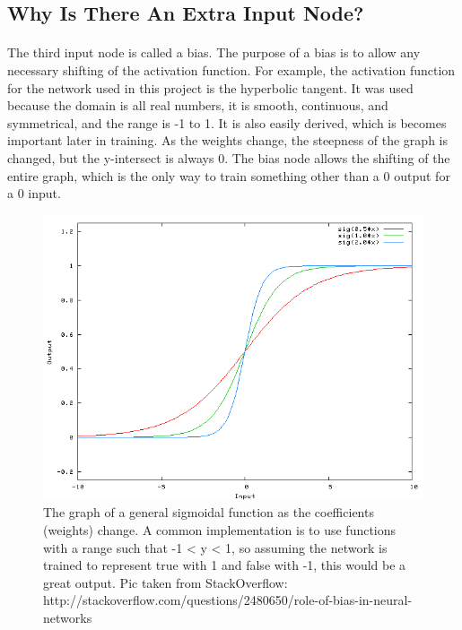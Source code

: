 \documentclass{article}
\begin{document}
\subsection{Why Is There An Extra Input Node?}
    \paragraph{}The third input node is called a bias. The purpose of a bias is to allow
    any necessary shifting of the activation function. For example, the activation function
    for the network used in this project is the hyperbolic tangent. It was used because the
    domain is all real numbers, it is smooth, continuous, and symmetrical, and the range
    is -1 to 1. It is also easily derived, which is becomes important later in training. As
    the weights change, the steepness of the graph is changed, but the y-intersect is always
    0. The bias node allows the shifting of the entire graph, which is the only way to train
    something other than a 0 output for a 0 input.
    \begin{figure}
        \centering
        \includegraphics[scale=0.4]{images/bias.png}
        \caption{The graph of a general sigmoidal function as the coefficients (weights)
            change. A common implementation is to use functions with a range such 
            that -1 < y < 1, so assuming the network is trained to represent true with 1 
            and false with -1, this would be a great output. Pic taken from StackOverflow: http://stackoverflow.com/questions/2480650/role-of-bias-in-neural-networks}
    \end{figure}
\end{document}

